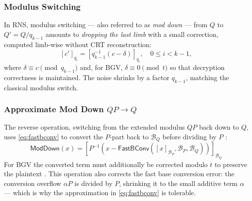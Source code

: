 \subsubsection{Modulus Switching}
In RNS, modulus switching --- also referred to as \textit{mod down} --- from $Q$ to $Q' = Q/q_{k-1}$ amounts to \textit{dropping the last limb} with a small correction, computed limb-wise without CRT reconstruction:
\begin{equation}
    \label{eq:rns-modswitch}
    [c']_{q_i} = \left[q_{k-1}^{-1}\left(c - \delta\right)\right]_{q_i}, \quad 0 \leq i < k-1,
\end{equation}
where $\delta \equiv c \pmod{q_{k-1}}$ and, for BGV, $\delta \equiv 0 \pmod{t}$ so that decryption correctness is maintained. The noise shrinks by a factor $q_{k-1}$, matching the classical modulus switch.

\subsubsection{Approximate Mod Down $QP \to Q$}
The reverse operation, switching from the extended modulus $QP$ back down to $Q$, uses \eqref{eq:fastbconv} to convert the $P$-part back to $\mathcal{B}_Q$ before dividing by $P$ \autocite{cryptoeprint:2012/099, cryptoeprint:2018/117}:
\begin{equation}
    \label{eq:approxmoddown}
    \mathsf{ModDown}(x) = \left[P^{-1}\left(x - \mathsf{FastBConv}([x]_{\mathcal{B}_P}, \mathcal{B}_P, \mathcal{B}_Q)\right)\right]_{\mathcal{B}_Q}
\end{equation}
For BGV the converted term must additionally be corrected modulo $t$ to preserve the plaintext \cite{cryptoeprint:2021/204}. This operation also corrects the fast base conversion error: the conversion overflow $\alpha P$ is divided by $P$, shrinking it to the small additive term $\alpha$ --- which is why the approximation in \eqref{eq:fastbconv} is tolerable.
